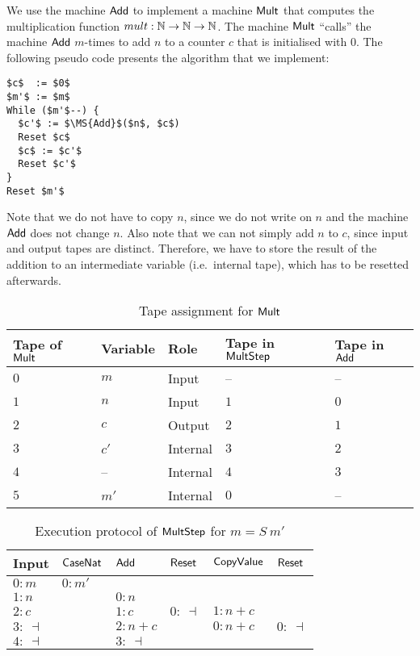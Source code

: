 We use the machine $\mathsf{Add}$ to implement a machine $\mathsf{Mult}$ that computes the multiplication function $mult : \mathbb{N}\rightarrow\mathbb{N}\rightarrow\mathbb{N}$.  The machine
$\mathsf{Mult}$ ``calls'' the machine $\mathsf{Add}$ $m$-times to add $n$ to a counter $c$ that is initialised with $0$.  The following pseudo code presents
the algorithm that we implement: { \small
\begin{lstlisting}[style=pseudocode]
$c$  := $0$
$m'$ := $m$
While ($m'$--) {
  $c'$ := $\MS{Add}$($n$, $c$)
  Reset $c$
  $c$ := $c'$
  Reset $c'$
}
Reset $m'$
\end{lstlisting}
}%
Note that we do not have to copy $n$, since we do not write on $n$ and the machine $\mathsf{Add}$ does not change
$n$.  Also note that we can not simply add $n$ to $c$, since input and output tapes are distinct.  Therefore, we have to store the result of the
addition to an intermediate variable (i.e.\ internal tape), which has to be resetted afterwards.

\begin{table}[t]
  \centering
  \begin{tabular}{l|l|l|l|l}
    Tape of $\mathsf{Mult}$ & Variable & Role & Tape in $\mathsf{MultStep}$ & Tape in $\mathsf{Add}$ \\ \hline
    $0$ & $m$  & Input    & --  & --  \\
    $1$ & $n$  & Input    & $1$ & $0$ \\
    $2$ & $c$  & Output   & $2$ & $1$ \\
    $3$ & $c'$ & Internal & $3$ & $2$ \\
    $4$ & --   & Internal & $4$ & $3$ \\
    $5$ & $m'$ & Internal & $0$ & --  \\
  \end{tabular}
  \caption{Tape assignment for $\mathsf{Mult}$}
  \label{tab:tapes-Mult}
\end{table}
\begin{table}[t]
  \centering
  \begin{tabular}{l||l|l|l|l|l}
    Input       & $\mathsf{CaseNat}$ & $\mathsf{Add}$  & $\mathsf{Reset}$ & $\mathsf{CopyValue}$ & $\mathsf{Reset}$   \\ \hline
    $0: m$      & $0 : m'$        &             &              &                  &                \\
    $1: n$      &                 & $0: n$      &              &                  &                \\
    $2: c$      &                 & $1: c$      & $0:~\dashv$  & $1: n+c$         &                \\
    $3:~\dashv$ &                 & $2: n+c$    &              & $0: n+c$         & $0:~\dashv$    \\
    $4:~\dashv$ &                 & $3:~\dashv$ &              &                  &                \\
  \end{tabular}
  \caption{Execution protocol of $\mathsf{MultStep}$ for $m=S~m'$}
  \label{tab:exec-MultStep}
\end{table}

